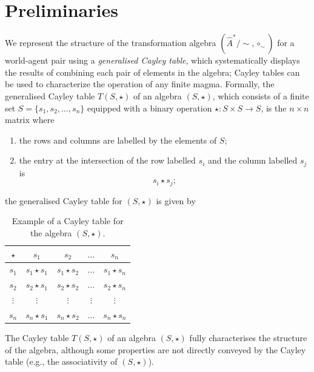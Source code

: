 \section{Preliminaries}

We represent the structure of the transformation algebra $(\hat{A}^{*}/\sim, \circ_{\sim})$ for a world-agent pair using a \emph{generalised Cayley table}, which systematically displays the results of combining each pair of elements in the algebra; Cayley tables can be used to characterize the operation of any finite magma.
Formally, the generalised Cayley table $T(S, \star)$ of an algebra $(S, \star)$, which consists of a finite set $S = \{s_{1}, s_{2}, \dots, s_{n}\}$ equipped with a binary operation $\star: S \times S \to S$, is the $n \times n$ matrix where
\begin{enumerate}
    \item the rows and columns are labelled by the elements of $S$;
    \item the entry at the intersection of the row labelled $s_{i}$ and the column labelled $s_{j}$ is
    \begin{equation}
        s_{i} \star s_{j};
    \end{equation}
\end{enumerate}
the generalised Cayley table for $(S, \star)$ is given by
\begin{table}[H]
    \centering
    \begin{tabular}{c|cccc}
        $\star$ & $s_{1}$ & $s_{2}$ & $\dots$ & $s_{n}$  \\
        \hline
        $s_{1}$ & $s_{1} \star s_{1}$ & $s_{1} \star s_{2}$ & $\dots$ & $s_{1} \star s_{n}$ \\
        $s_{2}$ & $s_{2} \star s_{1}$ & $s_{2} \star s_{2}$ & $\dots$ & $s_{2} \star s_{n}$ \\
        $\vdots$ & $\vdots$ & $\vdots$ & $\vdots$ & $\vdots$ \\
        $s_{n}$ & $s_{n} \star s_{1}$ & $s_{n} \star s_{2}$ & $\dots$ & $s_{n} \star s_{n}$
    \end{tabular}
    \caption{
    Example of a Cayley table for the algebra $(S, \star)$.
    }
\end{table}

The Cayley table $T(S, \star)$ of an algebra $(S, \star)$ fully characterises the structure of the algebra, although some properties are not directly conveyed by the Cayley table (e.g., the associativity of $(S, \star)$).

